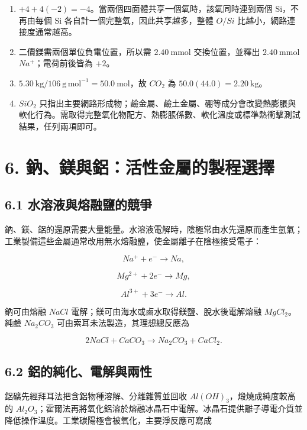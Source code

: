 \documentclass[11pt,a4paper]{article}
\providecommand{\tightlist}{%
  \setlength{\itemsep}{0pt}\setlength{\parskip}{0pt}}
\begin{document}
\begin{enumerate}
\def\labelenumi{\arabic{enumi}.}
\tightlist
\item
  \(+4+4(-2)=-4\)。當兩個四面體共享一個氧時，該氧同時連到兩個 Si，不再由每個 Si 各自計一個完整氧，因此共享越多，整體 \(O/Si\) 比越小，網路連接度通常越高。
\item
  二價鎂需兩個單位負電位置，所以需 \(2.40\ \mathrm{mmol}\) 交換位置，並釋出 \(2.40\ \mathrm{mmol}\) \(Na^+\)；電荷前後皆為 \(+2\)。
\item
  \(5.30\ \mathrm{kg}/106\ \mathrm{g\,mol^{-1}}=50.0\ \mathrm{mol}\)，故 \(CO_2\) 為 \(50.0(44.0)=2.20\ \mathrm{kg}\)。
\item
  \(SiO_2\) 只指出主要網路形成物；鹼金屬、鹼土金屬、硼等成分會改變熱膨脹與軟化行為。需取得完整氧化物配方、熱膨脹係數、軟化溫度或標準熱衝擊測試結果，任列兩項即可。
\end{enumerate}

\section{6. 鈉、鎂與鋁：活性金屬的製程選擇}\label{ux9209ux9382ux8207ux92c1ux6d3bux6027ux91d1ux5c6cux7684ux88fdux7a0bux9078ux64c7}

\subsection{6.1 水溶液與熔融鹽的競爭}\label{ux6c34ux6eb6ux6db2ux8207ux7194ux878dux9e7dux7684ux7af6ux722d}

鈉、鎂、鋁的還原需要大量能量。水溶液電解時，陰極常由水先還原而產生氫氣；工業製備這些金屬通常改用無水熔融鹽，使金屬離子在陰極接受電子：

\[
Na^++e^-\rightarrow Na,
\]

\[
Mg^{2+}+2e^-\rightarrow Mg,
\]

\[
Al^{3+}+3e^-\rightarrow Al.
\]

鈉可由熔融 \(NaCl\) 電解；鎂可由海水或鹵水取得鎂鹽、脫水後電解熔融 \(MgCl_2\)。純鹼 \(Na_2CO_3\) 可由索耳未法製造，其理想總反應為

\[
2NaCl+CaCO_3\rightarrow Na_2CO_3+CaCl_2.
\]

\subsection{6.2 鋁的純化、電解與兩性}\label{ux92c1ux7684ux7d14ux5316ux96fbux89e3ux8207ux5169ux6027}

鋁礦先經拜耳法把含鋁物種溶解、分離雜質並回收 \(Al(OH)_3\)，煅燒成純度較高的 \(Al_2O_3\)；霍爾法再將氧化鋁溶於熔融冰晶石中電解。冰晶石提供離子導電介質並降低操作溫度。工業碳陽極會被氧化，主要淨反應可寫成
\end{document}
